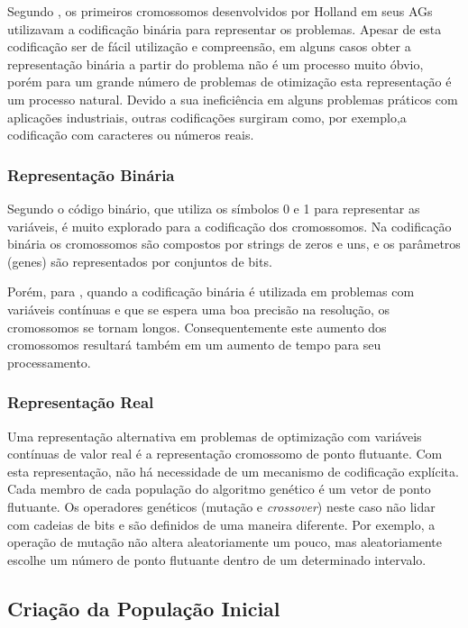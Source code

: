Segundo \cite{linden12}, os primeiros cromossomos desenvolvidos por Holland em seus AGs utilizavam a codificação binária para representar os problemas. Apesar de esta codificação ser de fácil utilização e compreensão, em alguns casos obter a representação binária a partir do problema não é um processo muito óbvio, porém para um grande número de problemas de otimização esta representação é um processo natural. Devido a sua ineficiência em alguns problemas práticos com aplicações industriais, outras codificações surgiram como, por exemplo,a codificação com caracteres ou números reais.


\subsubsection{Representação Binária} 

Segundo \cite{mognon04} o código binário, que utiliza os símbolos 0 e 1 para representar as variáveis, é muito explorado para a codificação dos cromossomos. Na codificação binária os cromossomos são compostos por strings de zeros e uns, e os parâmetros (genes) são representados por conjuntos de bits. 

Porém, para \cite{catarina03}, quando a codificação binária é utilizada em problemas com variáveis contínuas e que se espera uma boa precisão na resolução, os cromossomos se tornam longos. Consequentemente este aumento dos cromossomos resultará também em um aumento de tempo para seu processamento.


\subsubsection{Representação Real}

Uma representação alternativa em problemas de optimização com variáveis contínuas de valor real é a representação cromossomo de ponto flutuante. Com esta representação, não há necessidade de um mecanismo de codificação explícita. Cada membro de cada população do algoritmo genético é um vetor de ponto flutuante. Os operadores genéticos (mutação e \textit{crossover}) neste caso não lidar com cadeias de bits e são definidos de uma maneira diferente. Por exemplo, a operação de mutação não altera aleatoriamente um pouco, mas aleatoriamente escolhe um número de ponto flutuante dentro de um determinado intervalo.



\subsection{Criação da População Inicial}



